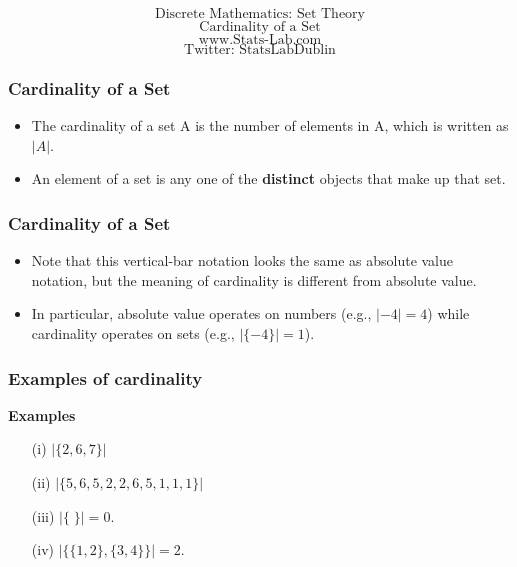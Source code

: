 \documentclass{beamer}
\begin{document}
\begin{frame}
\huge
\[ \mbox{Discrete Mathematics: Set Theory}\]
\[ \mbox{Cardinality of a Set}\]
\Large
\[ \mbox{www.Stats-Lab.com}\]
\[ \mbox{Twitter: StatsLabDublin}\]
\end{frame}
\begin{frame}
\frametitle{Cardinality of a Set}
\Large
\vspace{-1cm}
\begin{itemize}
\item The cardinality of a set A is the number of elements in A, which is written as $|A|$.
\item An element of a set is any one of the \textbf{distinct} objects that make up that set.

\end{itemize}
\end{frame}
\begin{frame}
\frametitle{Cardinality of a Set}
\Large
\vspace{-1cm}
\begin{itemize}

\item Note that this vertical-bar notation looks the same as absolute value notation, 
but the meaning of cardinality is different from absolute value.

\item In particular, absolute value operates on numbers (e.g., $|-4| = 4$) 
while cardinality operates on sets (e.g., $|\{-4\}| = 1$).
\end{itemize}
\end{frame}
\begin{frame}
\frametitle{Examples of cardinality}
\LARGE
\vspace{-1cm}
\textbf{Examples}
\begin{itemize}
\item[(i)] $|\{2,6,7\}|$
\item[(ii)] $|\{5,6,5,2,2,6,5,1,1,1\}|$
\item[(iii)] $|\{ \;\}| = 0$. %
\item[(iv)] $|\{\{1,2\},\{3,4\}\}| = 2$. 
\end{itemize}
\end{frame}
\end{document}
